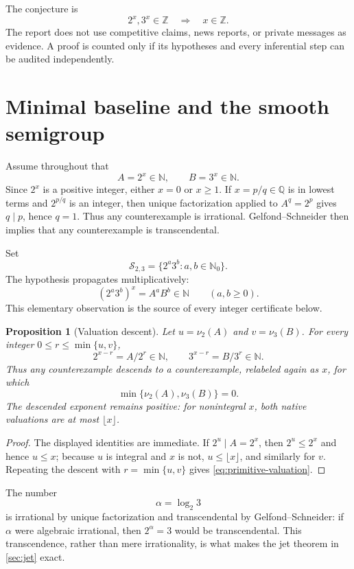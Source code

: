 \documentclass[11pt]{article}
\newtheorem{proposition}[theorem]{Proposition}
\theoremstyle{definition}
\theoremstyle{remark}
\newcommand{\Ssmooth}{\mathcal S_{2,3}}
\newcommand{\NN}{\mathbb N}
\newcommand{\ZZ}{\mathbb Z}
\newcommand{\QQ}{\mathbb Q}
\begin{document}
The conjecture is
\[
  2^x,3^x\in\ZZ \quad\Longrightarrow\quad x\in\ZZ.
\]
The report does not use competitive claims, news reports, or private messages as evidence. A proof is counted only if its hypotheses and every inferential step can be audited independently.

\section{Minimal baseline and the smooth semigroup}

Assume throughout that
\[
 A=2^x\in\NN,\qquad B=3^x\in\NN.
\]
Since $2^x$ is a positive integer, either $x=0$ or $x\ge 1$. If $x=p/q\in\QQ$ is in lowest terms and $2^{p/q}$ is an integer, then unique factorization applied to $A^q=2^p$ gives $q\mid p$, hence $q=1$. Thus any counterexample is irrational. Gelfond--Schneider then implies that any counterexample is transcendental.

Set
\[
 \Ssmooth=\{2^a3^b:a,b\in\NN_0\}.
\]
The hypothesis propagates multiplicatively:
\begin{equation}\label{eq:smooth-integrality}
  (2^a3^b)^x=A^aB^b\in\NN\qquad(a,b\ge0).
\end{equation}
This elementary observation is the source of every integer certificate below.


\begin{proposition}[Valuation descent]\label{prop:valuation-descent}
Let $u=\nu_2(A)$ and $v=\nu_3(B)$. For every integer $0\le r\le\min\{u,v\}$,
\[
 2^{x-r}=A/2^r\in\NN,\qquad 3^{x-r}=B/3^r\in\NN.
\]
Thus any counterexample descends to a counterexample, relabeled again as $x$, for which
\begin{equation}\label{eq:primitive-valuation}
 \min\{\nu_2(A),\nu_3(B)\}=0.
\end{equation}
The descended exponent remains positive: for nonintegral $x$, both native valuations are at most $\lfloor x\rfloor$.
\end{proposition}

\begin{proof}
The displayed identities are immediate. If $2^u\mid A=2^x$, then $2^u\le2^x$ and hence $u\le x$; because $u$ is integral and $x$ is not, $u\le\lfloor x\rfloor$, and similarly for $v$. Repeating the descent with $r=\min\{u,v\}$ gives \eqref{eq:primitive-valuation}.
\end{proof}

The number
\[
 \alpha=\log_2 3
\]
is irrational by unique factorization and transcendental by Gelfond--Schneider: if $\alpha$ were algebraic irrational, then $2^\alpha=3$ would be transcendental. This transcendence, rather than mere irrationality, is what makes the jet theorem in \cref{sec:jet} exact.
\end{document}
